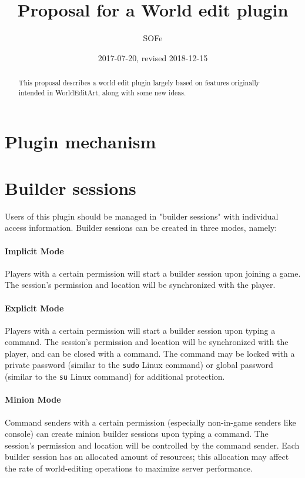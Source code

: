 \documentclass{report}
\title{Proposal for a World edit plugin}
\date{2017-07-20, revised 2018-12-15}
\author{SOFe}
\begin{document}
	\maketitle

	\begin{abstract}
		This proposal describes a world edit plugin largely based on features originally intended in WorldEditArt,
		along with some new ideas.
	\end{abstract}

	\tableofcontents

	\newpage

	\section{Plugin mechanism}
		\section{Builder sessions}
			Users of this plugin should be managed in "builder sessions" with individual access information. Builder
			sessions can be created in three modes, namely:
			\paragraph{Implicit Mode}
				Players with a certain permission will start a builder session upon joining a game. The session's
				permission and location will be synchronized with the player.
			\paragraph{Explicit Mode}
				Players with a certain permission will start a builder session upon typing a command. The session's
				permission and location will be synchronized with the player, and can be closed with a command. The
				command may be locked with a private password (similar to the \texttt{sudo} Linux command) or global
				password (similar to the \texttt{su} Linux command) for additional protection.
			\paragraph{Minion Mode}
				Command senders with a certain permission (especially non-in-game senders like console) can create
				minion builder sessions upon typing a command. The session's permission and location will be controlled
				by the command sender.
			Each builder session has an allocated amount of resources; this allocation may affect the rate of
			world-editing operations to maximize server performance.
\end{document}
